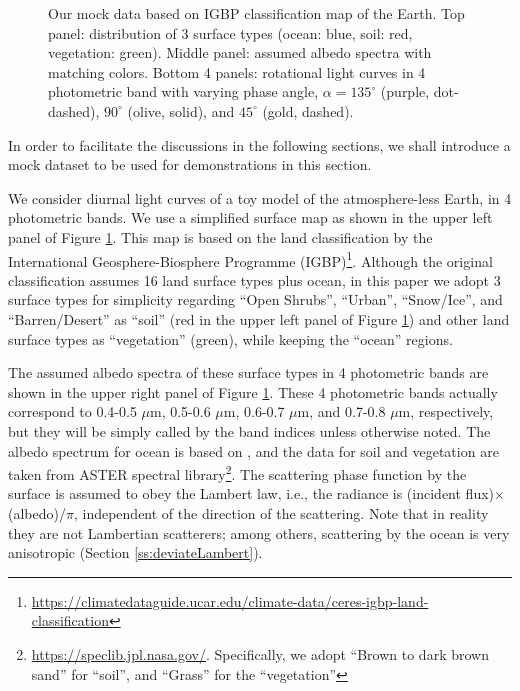 \documentclass[iop,numberedappendix,apj,]{emulateapj}
\def\memoJLY#1{\color{green}[JLY: {\bf #1}]\color{black}}
\begin{document}
\begin{figure}[t]
\begin{center}
    \end{center}
    \caption{Our mock data based on IGBP classification map of the Earth. Top panel: distribution of 3 surface types (ocean: blue, soil: red, vegetation: green). Middle panel: assumed albedo spectra with matching colors. Bottom 4 panels: rotational light curves in 4 photometric band with varying phase angle, $\alpha = 135^{\circ }$ (purple, dot-dashed), $90^{\circ }$ (olive, solid), and $45^{\circ }$ (gold, dashed). }
\label{fig:mockdata}
\end{figure}


In order to facilitate the discussions in the following sections, we shall introduce a mock dataset to be used for demonstrations in this section. 

We consider diurnal light curves of a toy model of the atmosphere-less Earth, in 4 photometric bands. 
We use a simplified surface map as shown in the upper left panel of Figure \ref{fig:mockdata}. 
This map is based on the land classification by the International Geosphere-Biosphere Programme (IGBP)\footnote{\url{https://climatedataguide.ucar.edu/climate-data/ceres-igbp-land-classification}}. 
Although the original classification assumes 16 land surface types plus ocean, in this paper we adopt 3 surface types for simplicity regarding ``Open Shrubs'', ``Urban'', ``Snow/Ice'', and ``Barren/Desert'' as ``soil'' (red in the upper left panel of Figure \ref{fig:mockdata}) and other land surface types as ``vegetation'' (green), while keeping the ``ocean'' regions. 


The assumed albedo spectra of these surface types in 4 photometric bands are shown in the upper right panel of Figure \ref{fig:mockdata}. 
These 4 photometric bands actually correspond to 0.4-0.5 $\mu $m, 0.5-0.6 $\mu $m, 0.6-0.7 $\mu $m, and 0.7-0.8 $\mu $m, respectively, but they will be simply called by the band indices unless otherwise noted. 
The albedo spectrum for ocean is based on \citet{Mclinden1997}, 
and the data for soil and vegetation are taken from ASTER spectral library\footnote{\url{https://speclib.jpl.nasa.gov/}. 
Specifically, we adopt  ``Brown to dark brown sand'' for ``soil'', and ``Grass'' for the ``vegetation''}. 
The scattering phase function by the surface is assumed to obey the Lambert law, i.e., the radiance is (incident flux)$\times $(albedo)/$\pi$, independent of the direction of the scattering. 
Note that in reality they are not Lambertian scatterers; among others,  scattering by the ocean is very anisotropic (Section \ref{ss:deviateLambert}).  
\end{document}
